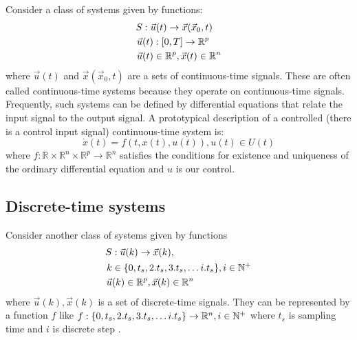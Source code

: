 
\noindent Consider a class of systems given by functions:
\begin{equation}
    \begin{split}
    S&: \vec{u}(t)  \to \vec{x}(\vec{x}_0,t) \\
    \vec{u}&(t): [0,T] \to \mathbb{R}^p \\
    \vec{u}&(t)\in \mathbb{R}^p , \vec{x}(t) \in \mathbb{R}^n \\
    \end{split}
\end{equation}
where $\vec{u}(t)$ and  $\vec{x}(\vec{x}_0,t)$ are a sets of continuous-time signals.
These are often called continuous-time systems because they operate on
continuous-time signals. Frequently, such systems can be defined by differential
equations that relate the input signal to the output signal.
A prototypical description of a controlled (there is a control input signal)
continuous-time system is:
\begin{equation}\label{eq:nonlinearsystem}
    \dot{x}(t) = f(t,x(t),u(t)), u(t) \in U(t)
\end{equation}
where $f:\mathbb{R}\times\mathbb{R}^n\times\mathbb{R}^p\to\mathbb{R}^n$
satisfies the conditions for existence
and uniqueness of the ordinary differential equation and $u$ is our control\cite{butcher1987numerical}.

\subsection{Discrete-time systems}
\noindent
\noindent Consider another class of systems given by functions
\begin{equation}
    \begin{split}
    S&: \vec{u}(k)  \to \vec{x}(k), \\
    k& \in \{0, t_s, 2.t_s, 3.t_s, \dots i.t_s\}, i \in \mathbb{N}^+\\
    \vec{u}&(k)\in \mathbb{R}^p , \vec{x}(k) \in \mathbb{R}^n\\
    \end{split}
\end{equation}
where $\vec{u}(k), \vec{x}(k)$ is a set of discrete-time signals. They can be represented by a function $f$ like $f:\{0, t_s, 2.t_s, 3.t_s, \dots i.t_s\} \to \mathbb{R}^n,  i \in \mathbb{N}^+$ where $t_s$ is sampling time and $i$ is discrete step \cite{shampine1997matlab}.

